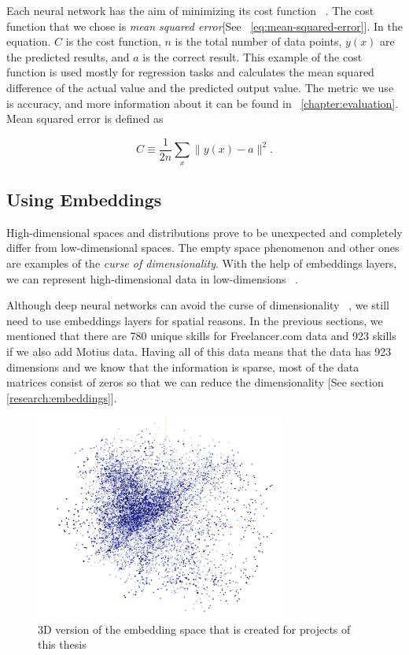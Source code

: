 Each neural network has the aim of minimizing its cost function ~\parencite{Goodfellow-et-al-2016}. The cost function that we chose is \textit{mean squared error}[See ~\eqref{eq:mean-squared-error}]. In the equation. $C$ is the cost function, $n$ is the total number of data points, $y(x)$ are the predicted results, and $a$ is the correct result. This example of the cost function is used mostly for regression tasks and calculates the mean squared difference of the actual value and the predicted output value. The metric we use is accuracy, and more information about it can be found in ~\autoref{chapter:evaluation}. Mean squared error is defined as

\begin{equation}
C \equiv \frac{1}{2 n} \sum_{x}\|y(x)-a\|^{2} .
\label{eq:mean-squared-error}
\end{equation}


\subsection{Using Embeddings}\label{subsection:using-embeddings}

High-dimensional spaces and distributions prove to be unexpected and completely differ from low-dimensional spaces. The empty space phenomenon and other ones are examples of the \textit{curse of dimensionality}. With the help of embeddings layers, we can represent high-dimensional data in low-dimensions  ~\parencite{lee2007nonlinear}.


Although deep neural networks can avoid the curse of dimensionality ~\parencite{poggio2017and}, we still need to use embeddings layers for spatial reasons. In the previous sections, we mentioned that there are 780 unique skills for Freelancer.com data and 923 skills if we also add Motius data. Having all of this data means that the data has 923 dimensions and we know that the information is sparse, most of the data matrices consist of zeros so that we can reduce the dimensionality [See section \ref{research:embeddings}].

\begin{figure}[htp]
	\centering
	\includegraphics[width=0.75\textwidth]{figures/EmbeddingThesis.png}
	\caption{3D version of the embedding space that is created for projects of this thesis}
	\label{fig:embedding-projection}
\end{figure}


